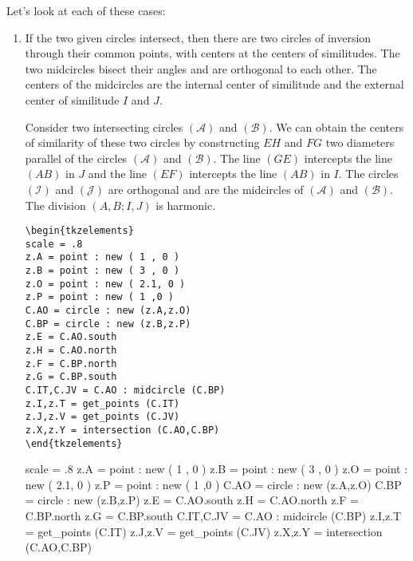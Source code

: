 \vspace{1em}
Let's look at each of these cases:
\begin{enumerate}[label=(\roman*)]
\item If the two given circles intersect, then there are two  circles of inversion through their common points, with centers at the centers of similitudes.  The two midcircles bisect their angles and are orthogonal to each other. The centers of the midcircles are the internal center of similitude and the external center of similitude $I$ and $J$.

Consider two intersecting circles $(\mathcal{A})$ and $(\mathcal{B})$.
We can obtain the centers of similarity of these two circles by constructing $EH$ and $FG$ two diameters parallel of the circles $(\mathcal{A})$ and $(\mathcal{B})$. The  line $(GE)$ intercepts  the line $(AB)$ in $J$ and the line $(EF)$ intercepts the line $(AB)$ in $I$. The circles $(\mathcal{I})$ and $(\mathcal{J})$ are orthogonal and are the midcircles of $(\mathcal{A})$ and $(\mathcal{B})$. The division $(A,B;I,J)$ is harmonic.

\begin{minipage}{.4\textwidth}
\begin{Verbatim}
\begin{tkzelements}
scale = .8
z.A = point : new ( 1 , 0 ) 
z.B = point : new ( 3 , 0 ) 
z.O = point : new ( 2.1, 0 ) 
z.P = point : new ( 1 ,0 ) 
C.AO = circle : new (z.A,z.O)
C.BP = circle : new (z.B,z.P)
z.E = C.AO.south
z.H = C.AO.north
z.F = C.BP.north
z.G = C.BP.south
C.IT,C.JV = C.AO : midcircle (C.BP)
z.I,z.T = get_points (C.IT) 
z.J,z.V = get_points (C.JV) 
z.X,z.Y = intersection (C.AO,C.BP)
\end{tkzelements}  
\end{Verbatim}
\end{minipage}
\begin{minipage}{.6\textwidth}
   \begin{tkzelements}
   scale = .8
   z.A = point : new ( 1 , 0 ) 
   z.B = point : new ( 3 , 0 ) 
   z.O = point : new ( 2.1, 0 ) 
   z.P = point : new ( 1 ,0 ) 
   C.AO = circle : new (z.A,z.O)
   C.BP = circle : new (z.B,z.P)
   z.E = C.AO.south
   z.H = C.AO.north
   z.F = C.BP.north
   z.G = C.BP.south
   C.IT,C.JV = C.AO : midcircle (C.BP)
   z.I,z.T = get_points (C.IT) 
   z.J,z.V = get_points (C.JV) 
   z.X,z.Y = intersection (C.AO,C.BP)
   \end{tkzelements}
\end{minipage}



\end{enumerate}
